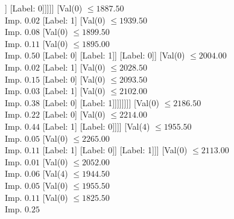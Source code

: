 \documentclass[margin=10pt]{standalone}
\begin{document}
\begin{forest}
													[Val($0$) $ \leq 1759.00$ \\ Imp. $0.10$
														[Label: 1]
														[Val($0$) $ \leq 1788.00$ \\ Imp. $0.08$
															[Label: 0]
															[Val($0$) $ \leq 1805.00$ \\ Imp. $0.17$
																[Label: 1]
																[Val($0$) $ \leq 1815.00$ \\ Imp. $0.11$
																	[Val($0$) $ \leq 1807.50$ \\ Imp. $0.50$
																		[Label: 0]
																		[Label: 1]]
																	[Label: 0]]]]]
													[Val($0$) $ \leq 1887.50$ \\ Imp. $0.02$
														[Label: 1]
														[Val($0$) $ \leq 1939.50$ \\ Imp. $0.08$
															[Val($0$) $ \leq 1899.50$ \\ Imp. $0.11$
																[Val($0$) $ \leq 1895.00$ \\ Imp. $0.50$
																	[Label: 0]
																	[Label: 1]]
																[Label: 0]]
															[Val($0$) $ \leq 2004.00$ \\ Imp. $0.02$
																[Label: 1]
																[Val($0$) $ \leq 2028.50$ \\ Imp. $0.15$
																	[Label: 0]
																	[Val($0$) $ \leq 2093.50$ \\ Imp. $0.03$
																		[Label: 1]
																		[Val($0$) $ \leq 2102.00$ \\ Imp. $0.38$
																			[Label: 0]
																			[Label: 1]]]]]]]]
												[Val($0$) $ \leq 2186.50$ \\ Imp. $0.22$
													[Label: 0]
													[Val($0$) $ \leq 2214.00$ \\ Imp. $0.44$
														[Label: 1]
														[Label: 0]]]]
											[Val($4$) $ \leq 1955.50$ \\ Imp. $0.05$
												[Val($0$) $ \leq 2265.00$ \\ Imp. $0.11$
													[Label: 1]
													[Label: 0]]
												[Label: 1]]]
										[Val($0$) $ \leq 2113.00$ \\ Imp. $0.01$
											[Val($0$) $ \leq 2052.00$ \\ Imp. $0.06$
												[Val($4$) $ \leq 1944.50$ \\ Imp. $0.05$
													[Val($0$) $ \leq 1955.50$ \\ Imp. $0.11$
														[Val($0$) $ \leq 1825.50$ \\ Imp. $0.25$

\end{forest}
\end{document}
